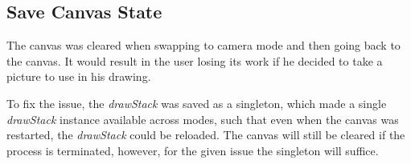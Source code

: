 \subsection{Save Canvas State}
The canvas was cleared when swapping to camera mode and then going back to the canvas.
It would result in the user losing its work if he decided to take a picture to use in his drawing.

To fix the issue, the \textit{drawStack} was saved as a singleton, which made a single \textit{drawStack} instance available across modes, such that even when the canvas was restarted, the \textit{drawStack} could be reloaded. 
The canvas will still be cleared if the process is terminated, however, for the given issue the singleton will suffice.